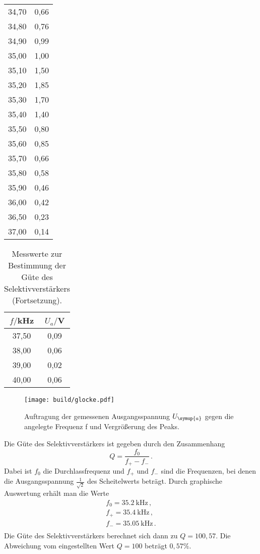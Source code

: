 \begin{table}[htp]
\begin{center}
\begin{tabular}{cc}
			34,70 & 0,66\\
			34,80 & 0,76\\
			34,90 & 0,99\\
			35,00 & 1,00\\
			35,10 & 1,50\\
			35,20 & 1,85\\
			35,30 & 1,70\\
			35,40 & 1,40\\
			35,50 & 0,80\\
			35,60 & 0,85\\
			35,70 & 0,66\\
			35,80 & 0,58\\
			35,90 & 0,46\\
			36,00 & 0,42\\
      36,50 & 0,23\\
      37,00 & 0,14\\
		\bottomrule
		\end{tabular}
	\end{center}
\end{table}
\begin{table}[htp]
	\begin{center}
    \caption{Messwerte zur Bestimmung der Güte des Selektivverstärkers (Fortsetzung).}
    \label{tab:guete2}
		\begin{tabular}{cc}
		\toprule
			{$f/$kHz} & {$U_a/$V}\\
			\midrule
			37,50 & 0,09\\
			38,00 & 0,06\\
			39,00 & 0,02\\
			40,00 & 0,06\\
		\bottomrule
		\end{tabular}
	\end{center}
\end{table}

\begin{figure}
  \centering
  \texttt{[image: build/glocke.pdf]}
  \caption{Auftragung der gemessenen Ausgangsspannung $U_{\symup{a}}$ gegen die angelegte
  Frequenz f und Vergrößerung des Peaks.}
  \label{fig:guete}
\end{figure}

Die Güte des Selektivverstärkers ist gegeben durch den Zusammenhang
\begin{equation}
  Q=\frac{f_0}{f_{+} - f_{-}} \,.
\end{equation}
Dabei ist $f_0$ die Durchlassfrequenz und $f_{+}$ und $f_{-}$ sind die Frequenzen,
bei denen die Ausgangsspannung $\frac{1}{\sqrt{2}}$ des Scheitelwerts beträgt. Durch
graphische Auswertung erhält man die Werte
\begin{align*}
  f_0=\SI{35.2}{\kilo\hertz}      \,,\\
  f_{+}=\SI{35.4}{\kilo\hertz}     \,, \\
  f_{-}=\SI{35.05}{\kilo\hertz}     \,.\\
\end{align*}
Die Güte des Selektivverstärkers berechnet sich dann zu $Q=100,57$. Die Abweichung
vom eingestellten Wert $Q=100$ beträgt $0,57\%$.


